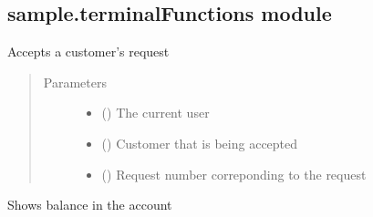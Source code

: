 \documentclass[letterpaper,10pt,english]{sphinxmanual}
\begin{document}
\subsection{sample.terminalFunctions module}
\label{\detokenize{sample:sample-terminalfunctions-module}}\label{\detokenize{sample:module-sample.terminalFunctions}}

\begin{fulllineitems}
\label{\detokenize{sample:sample.terminalFunctions.acceptRequest}}
Accepts a customer’s request
\begin{quote}\begin{description}
\item[{Parameters}] \leavevmode\begin{itemize}
\item {} 
 () \textendash{} The current user

\item {} 
 () \textendash{} Customer that is being accepted

\item {} 
 () \textendash{} Request number correponding to the request

\end{itemize}

\end{description}\end{quote}

\end{fulllineitems}


\begin{fulllineitems}
\label{\detokenize{sample:sample.terminalFunctions.balance}}
Shows balance in the account

\end{fulllineitems}
\end{document}
